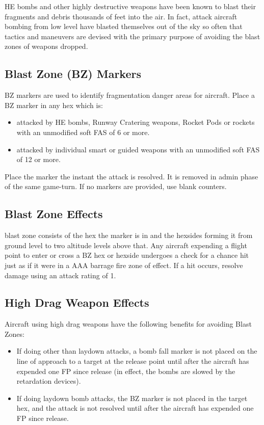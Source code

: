 \begin{advancedrules}

    HE bombs and other highly destructive weapons have been known to blast their fragments and debris thousands of feet into the air. In fact, attack aircraft bombing from low level have blasted themselves out of the sky so often that tactics and maneuvers are devised with the primary purpose of avoiding the blast zones of weapons dropped.

    \subsection{Blast Zone (BZ) Markers} BZ markers are used to identify fragmentation danger areas for aircraft. Place a BZ marker in any hex which is:

    \begin{itemize}
        \item attacked by HE bombs, Runway Cratering weapons, Rocket Pods or rockets with an unmodified soft FAS of 6 or more.

        \item attacked by individual smart or guided weapons with an unmodified soft FAS of 12 or more.
    \end{itemize}

    Place the marker the instant the attack is resolved. It is removed in admin phase of the same game-turn. If no markers are provided, use blank counters.

    \subsection{Blast Zone Effects}  blast zone consists of the hex the marker is in and the hexsides forming it from ground level to two altitude levels above that. Any aircraft expending a flight point to enter or cross a BZ hex or hexside undergoes a check for a chance hit just as if it were in a AAA barrage fire zone of effect. If a hit occurs, resolve damage using an attack rating of 1.

    \subsection{High Drag Weapon Effects} Aircraft using high drag weapons have the following benefits for avoiding Blast Zones:

    \begin{itemize}
        \item If doing other than laydown attacks, a bomb fall marker is not placed on the line of approach to a target at the release point until after the aircraft has expended one FP since release (in effect, the bombs are slowed by the retardation devices).

        \item If doing laydown bomb attacks, the BZ marker is not placed in the target hex, and the attack is not resolved until after the aircraft has expended one FP since release.
    \end{itemize}

\end{advancedrules}
